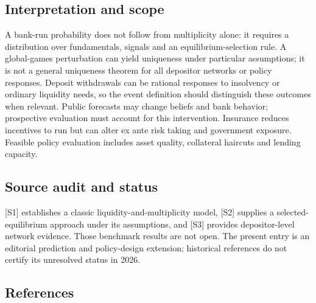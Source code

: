 \documentclass[11pt,a4paper]{article}
\begin{document}
\subsection*{Interpretation and scope}
A bank-run probability does not follow from multiplicity alone: it requires a distribution over fundamentals, signals and an equilibrium-selection rule. A global-games perturbation can yield uniqueness under particular assumptions; it is not a general uniqueness theorem for all depositor networks or policy responses. Deposit withdrawals can be rational responses to insolvency or ordinary liquidity needs, so the event definition should distinguish these outcomes when relevant. Public forecasts may change beliefs and bank behavior; prospective evaluation must account for this intervention. Insurance reduces incentives to run but can alter ex ante risk taking and government exposure. Feasible policy evaluation includes asset quality, collateral haircuts and lending capacity.

\subsection*{Source audit and status}
[S1] establishes a classic liquidity-and-multiplicity model, [S2] supplies a selected-equilibrium approach under its assumptions, and [S3] provides depositor-level network evidence. Those benchmark results are not open. The present entry is an editorial prediction and policy-design extension; historical references do not certify its unresolved status in 2026.

\subsection*{References}
\end{document}

